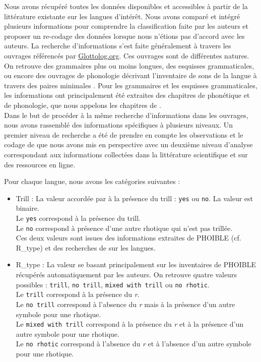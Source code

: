 Nous avons récupéré toutes les données disponibles et accessibles à partir de la littérature existante sur les langues d'intérêt.
Nous avons comparé et intégré plusieurs informations pour comprendre la classification faite par les auteurs et proposer un re-codage des données lorsque nous n'étions pas d'accord avec les auteurs. La recherche d'informations s'est faite généralement à travers les ouvrages référencés par \href{https://glottolog.org/}{Glottolog.org}. Ces ouvrages sont de différentes natures. On retrouve des grammaires plus ou moins longues, des esquisses grammaticales, ou encore des ouvrages de phonologie décrivant l'inventaire de sons de la langue à travers des paires minimales \parencite{hammarstromSimultaneousVisualizationLanguage2018}.
Pour les grammaires et les esquisses grammaticales, les informations ont principalement été extraites des chapitres de phonétique et de phonologie, que nous appelons les chapitres de .\\


Dans le but de procéder à la même recherche d'informations dans les ouvrages, nous avons rassemblé des informations spécifiques à plusieurs niveaux. Un premier niveau de recherche a été de prendre en compte les observations et le codage de \textcite{winterTrilledAssociatedRoughness2022} que nous avons mis en perspective avec un deuxième niveau d'analyse correspondant aux informations collectées dans la littérature scientifique et sur des ressources en ligne.

Pour chaque langue, nous avons les catégories suivantes :

\begin{itemize}
	\item Trill : La valeur accordée par \citeauthor{winterTrilledAssociatedRoughness2022} à la présence du trill : \texttt{yes} ou \texttt{no}. La valeur est binaire.\\
		Le \texttt{yes} correspond à la présence du trill.\\
		Le \texttt{no} correspond à présence d'une autre rhotique qui n'est pas trillée.\\
		Ces deux valeurs sont issues des informations extraites de PHOIBLE (cf. R\_type) et des recherches de \citeauthor{winterTrilledAssociatedRoughness2022} sur les langues.
	\item R\_type : La valeur se basant principalement sur les inventaires de PHOIBLE récupérés automatiquement par les auteurs. On retrouve quatre valeurs possibles : \texttt{trill}, \texttt{no trill}, \texttt{mixed with trill} ou \texttt{no rhotic}.\\
	Le \texttt{trill} correspond à la présence du \textit{r}.\\
	Le \texttt{no trill} correspond à l'absence du \textit{r} mais à la présence d'un autre symbole pour une rhotique.\\
	Le \texttt{mixed with trill} correspond à la présence du \textit{r} et à la présence d'un autre symbole pour une rhotique.\\
	Le \texttt{no rhotic} correspond à l'absence du \textit{r} et à l'absence d'un autre symbole pour une rhotique.
\end{itemize}

